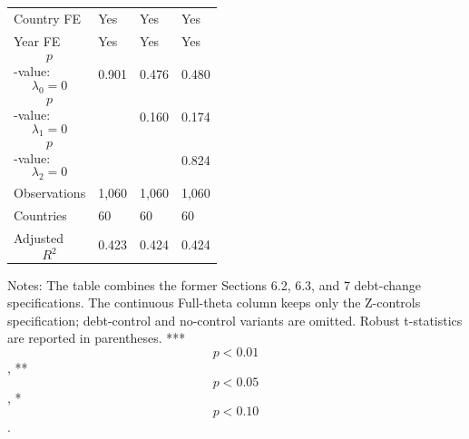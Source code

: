 \begin{table}[H]
\begin{threeparttable}
\begin{tabularx}{\textwidth}{lYYY}
Country FE & Yes & Yes & Yes \\
Year FE & Yes & Yes & Yes \\
$$p$$-value: $$\lambda_0=0$$ & 0.901 & 0.476 & 0.480 \\
$$p$$-value: $$\lambda_1=0$$ &  & 0.160 & 0.174 \\
$$p$$-value: $$\lambda_2=0$$ &  &  & 0.824 \\
Observations & 1,060 & 1,060 & 1,060 \\
Countries & 60 & 60 & 60 \\
Adjusted $$R^2$$ & 0.423 & 0.424 & 0.424 \\
\bottomrule
\end{tabularx}
\begin{tablenotes}[flushleft]\footnotesize
\item Notes: The table combines the former Sections 6.2, 6.3, and 7 debt-change specifications. The continuous Full-theta column keeps only the Z-controls specification; debt-control and no-control variants are omitted. Robust t-statistics are reported in parentheses. *** $$p<0.01$$, ** $$p<0.05$$, * $$p<0.10$$.
\end{tablenotes}
\end{threeparttable}
\end{table}
